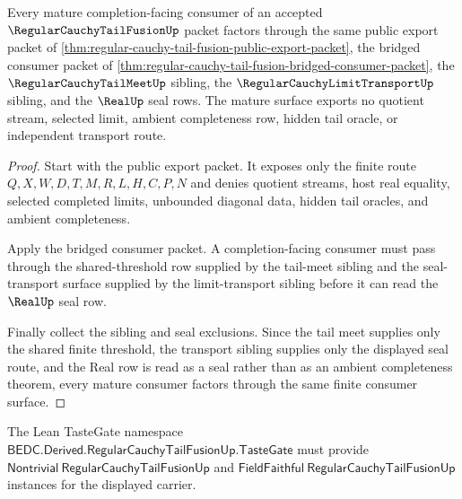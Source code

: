 \begin{theorem}
\label{thm:regular-cauchy-tail-fusion-mature-consumer-surface}
Every mature completion-facing consumer of an accepted $\RegularCauchyTailFusionUp$ packet factors through the same public export packet of \autoref{thm:regular-cauchy-tail-fusion-public-export-packet}, the bridged consumer packet of \autoref{thm:regular-cauchy-tail-fusion-bridged-consumer-packet}, the $\RegularCauchyTailMeetUp$ sibling, the $\RegularCauchyLimitTransportUp$ sibling, and the $\RealUp$ seal rows. The mature surface exports no quotient stream, selected limit, ambient completeness row, hidden tail oracle, or independent transport route.
\end{theorem}
\begin{proof}
Start with the public export packet. It exposes only the finite route $Q,X,W,D,T,M,R,L,H,C,P,N$ and denies quotient streams, host real equality, selected completed limits, unbounded diagonal data, hidden tail oracles, and ambient completeness.

Apply the bridged consumer packet. A completion-facing consumer must pass through the shared-threshold row supplied by the tail-meet sibling and the seal-transport surface supplied by the limit-transport sibling before it can read the $\RealUp$ seal row.

Finally collect the sibling and seal exclusions. Since the tail meet supplies only the shared finite threshold, the transport sibling supplies only the displayed seal route, and the Real row is read as a seal rather than as an ambient completeness theorem, every mature consumer factors through the same finite consumer surface.
\end{proof}

The Lean TasteGate namespace $\mathsf{BEDC.Derived.RegularCauchyTailFusionUp.TasteGate}$ must provide $\mathsf{Nontrivial}\ \mathsf{RegularCauchyTailFusionUp}$ and $\mathsf{FieldFaithful}\ \mathsf{RegularCauchyTailFusionUp}$ instances for the displayed carrier.

